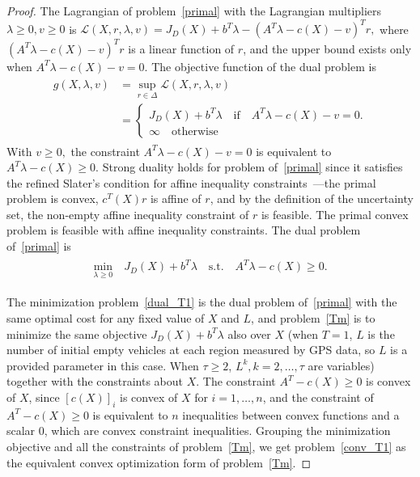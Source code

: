 \documentclass[10pt,twocolumn,twoside,english]{IEEEtran}
\begin{document}
\begin{proof}
The Lagrangian of problem~\eqref{primal} with the Lagrangian multipliers $\lambda \geq 0, v\geq 0$ is
$\mathcal{L}(X,r,\lambda,v)=J_D(X)+b^T\lambda-(A^T\lambda-c(X)-v)^T r,$
where $(A^T\lambda-c(X)-v)^T r$ is a linear function of $r$, and the upper bound exists only when $A^T\lambda-c(X)-v=0$.
The objective function of the dual problem is
\begin{align*}
\begin{split}
g(X,\lambda,v)&=\sup_{r\in \Delta} \mathcal{L}(X,r,\lambda,v)\\
                      &=\begin{cases} J_D(X)+b^T\lambda\quad \text{if}\quad A^T\lambda-c(X)-v=0.\\
                                                         \infty \quad\text{otherwise}
                          \end{cases}
\end{split}
\end{align*}
With $v\geq 0,$ the constraint $A^T\lambda-c(X)-v=0$ is equivalent to $A^T\lambda-c(X) \geq 0.$ Strong duality holds for problem of~\eqref{primal} since it satisfies the refined Slater's condition for affine inequality constraints~\cite[Chapter 5.2.3]{book_convex}---the primal problem is convex, $c^T(X) r$ is affine of $r$, and by the definition of the uncertainty set, the non-empty affine inequality constraint of $r$ is feasible. The primal convex problem is feasible with affine inequality constraints. The dual problem of~\eqref{primal} is
\begin{align}
\begin{split}
\underset{\lambda \geq 0}{\text{min}} \quad J_D(X)+b^T\lambda \quad
\text{s.t.}\quad A^T\lambda-c(X) \geq 0.
\end{split}
\label{dual_T1}
\end{align}

The minimization problem~\eqref{dual_T1} is  the dual problem of~\eqref{primal} with the same optimal cost for any fixed value of $X$ and $L$, and problem~\eqref{Tm} is to minimize the same objective $J_D(X)+b^T\lambda$ also over $X$ (when $T=1$, $L$ is the number of initial empty vehicles at each region measured by GPS data, so $L$ is a provided parameter in this case. When $\tau \geqslant 2$, $L^k, k=2,\dots, \tau$ are variables) together with the constraints about $X$. The constraint $A^T-c(X)\geq 0$ is convex of $X$, since $[c(X)]_i$ is convex of $X$ for $i=1,\dots,n$, and the constraint of $A^T-c(X)\geq 0$ is equivalent to $n$ inequalities between convex functions and a scalar $0$, which are convex constraint inequalities. Grouping the minimization objective and all the constraints of problem~\eqref{Tm}, we get problem~\eqref{conv_T1} as the equivalent convex optimization form of problem~\eqref{Tm}.
\end{proof}
\end{document}
